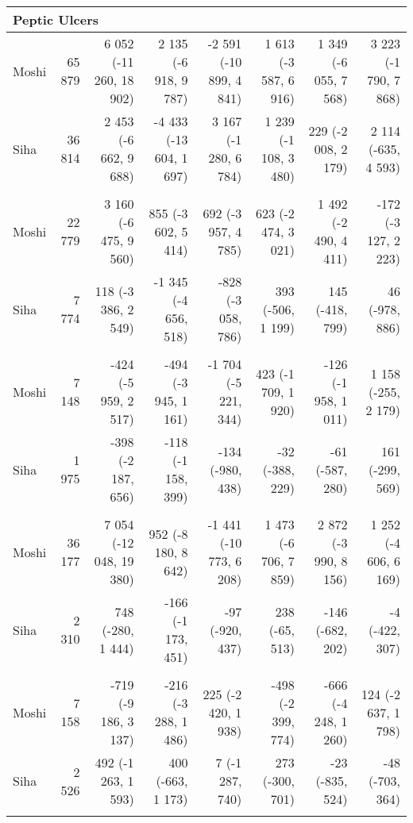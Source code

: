 \begin{table}[t]
\begin{tabular*}{\linewidth}{@{\extracolsep{\fill}}l|rrrrrrr}
\multicolumn{8}{l}{Peptic Ulcers} \\[2.5pt] 
\midrule\addlinespace[2.5pt]
Moshi & 65 879 & 6 052 (-11 260, 18 902) & 2 135 (-6 918, 9 787) & -2 591 (-10 899, 4 841) & 1 613 (-3 587, 6 916) & 1 349 (-6 055, 7 568) & 3 223 (-1 790, 7 868) \\ 
Siha & 36 814 & 2 453 (-6 662, 9 688) & -4 433 (-13 604, 1 697) & 3 167 (-1 280, 6 784) & 1 239 (-1 108, 3 480) & 229 (-2 008, 2 179) & 2 114 (-635, 4 593) \\ 
\midrule\addlinespace[2.5pt]
\multicolumn{8}{l}{Epilepsy} \\[2.5pt] 
\midrule\addlinespace[2.5pt]
Moshi & 22 779 & 3 160 (-6 475, 9 560) & 855 (-3 602, 5 414) & 692 (-3 957, 4 785) & 623 (-2 474, 3 021) & 1 492 (-2 490, 4 411) & -172 (-3 127, 2 223) \\ 
Siha & 7 774 & 118 (-3 386, 2 549) & -1 345 (-4 656, 518) & -828 (-3 058, 786) & 393 (-506, 1 199) & 145 (-418, 799) & 46 (-978, 886) \\ 
\midrule\addlinespace[2.5pt]
\multicolumn{8}{l}{Neuroses} \\[2.5pt] 
\midrule\addlinespace[2.5pt]
Moshi & 7 148 & -424 (-5 959, 2 517) & -494 (-3 945, 1 161) & -1 704 (-5 221, 344) & 423 (-1 709, 1 920) & -126 (-1 958, 1 011) & 1 158 (-255, 2 179) \\ 
Siha & 1 975 & -398 (-2 187, 656) & -118 (-1 158, 399) & -134 (-980, 438) & -32 (-388, 229) & -61 (-587, 280) & 161 (-299, 569) \\ 
\midrule\addlinespace[2.5pt]
\multicolumn{8}{l}{Psychoses} \\[2.5pt] 
\midrule\addlinespace[2.5pt]
Moshi & 36 177 & 7 054 (-12 048, 19 380) & 952 (-8 180, 8 642) & -1 441 (-10 773, 6 208) & 1 473 (-6 706, 7 859) & 2 872 (-3 990, 8 156) & 1 252 (-4 606, 6 169) \\ 
Siha & 2 310 & 748 (-280, 1 444) & -166 (-1 173, 451) & -97 (-920, 437) & 238 (-65, 513) & -146 (-682, 202) & -4 (-422, 307) \\ 
\midrule\addlinespace[2.5pt]
\multicolumn{8}{l}{Dysentery} \\[2.5pt] 
\midrule\addlinespace[2.5pt]
Moshi & 7 158 & -719 (-9 186, 3 137) & -216 (-3 288, 1 486) & 225 (-2 420, 1 938) & -498 (-2 399, 774) & -666 (-4 248, 1 260) & 124 (-2 637, 1 798) \\ 
Siha & 2 526 & 492 (-1 263, 1 593) & 400 (-663, 1 173) & 7 (-1 287, 740) & 273 (-300, 701) & -23 (-835, 524) & -48 (-703, 364) \\ 
\midrule\addlinespace[2.5pt]
\multicolumn{8}{l}{Intestinal Worms} \\[2.5pt] 

\end{tabular*}
\end{table}
